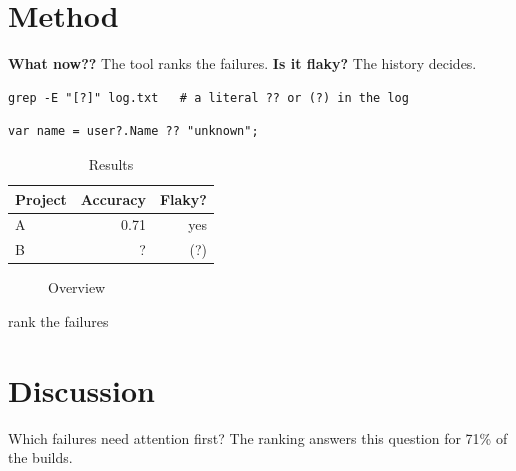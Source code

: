 \section{Method}\label{sec:method}
\textbf{What now??} The tool ranks the failures. \textbf{Is it flaky?} The history decides.
\begin{verbatim}
grep -E "[?]" log.txt   # a literal ?? or (?) in the log
\end{verbatim}
\begin{lstlisting}[language={[Sharp]C},basicstyle=\ttfamily\small,keywordstyle=\bfseries]
var name = user?.Name ?? "unknown";
\end{lstlisting}
\begin{table}[h]\caption{Results}\label{tab:results}\centering
\begin{tabular}{lrr}\hline \textbf{Project} & \textbf{Accuracy} & \textbf{Flaky?}\\\hline
A & 0.71 & yes\\ B & ? & (?)\\\hline\end{tabular}
\end{table}
\begin{figure}[h]\centering
{}
\caption{Overview}\label{fig:overview}
\end{figure}
\begin{algorithm}[h]\caption{Rank}\label{alg:rank}
\begin{algorithmic}\STATE rank the failures\end{algorithmic}
\end{algorithm}

\section{Discussion}\label{sec:discussion}
Which failures need attention first? The ranking answers this question for 71\% of the builds.

